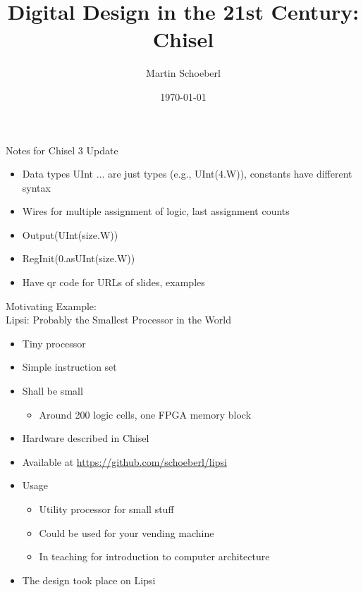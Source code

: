 \documentclass[xcolor=pdflatex,dvipsnames,table]{beamer}
\title{Digital Design in the 21st Century: Chisel}
\author{Martin Schoeberl}
\date{\today}
\institute{Technical University of Denmark}
\begin{document}
\begin{frame}
\titlepage
\end{frame}

\begin{frame}[fragile]{Notes for Chisel 3 Update}
\begin{itemize}
\item Data types UInt ... are just types (e.g., UInt(4.W)), constants have different syntax
\item Wires for multiple assignment of logic, last assignment counts

\item Output(UInt(size.W))
\item RegInit(0.asUInt(size.W))
\item Have qr code for URLs of slides, examples
\end{itemize}
\end{frame}

\begin{frame}[fragile]{Motivating Example:\\
Lipsi: Probably the Smallest Processor in the World}
\begin{itemize}
\item Tiny processor
\item Simple instruction set
\item Shall be small
\begin{itemize}
\item Around 200 logic cells, one FPGA memory block
\end{itemize}
\item Hardware described in Chisel
\item Available at \url{https://github.com/schoeberl/lipsi}
\item Usage
\begin{itemize}
\item Utility processor for small stuff
\item Could be used for your vending machine
\item In teaching for introduction to computer architecture
\end{itemize}
\item The design took place on Lipsi
\end{itemize}
\end{frame}
\end{document}
